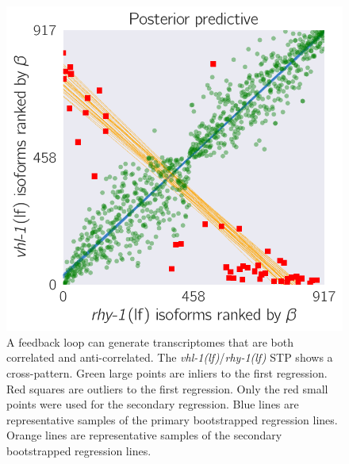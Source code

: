 \documentclass[10pt, onecolumn]{article}
\newcommand{\rhy}{\emph{\mbox{rhy-1}(lf)}}
\newcommand{\vhl}{\emph{\mbox{vhl-1}(lf)}}
\begin{document}
\begin{figure}[tbhp]
\centering
\includegraphics[width=.4\textwidth]{../figs/multiplemodes-ed.pdf}
\caption{
A feedback loop can generate transcriptomes that are both
correlated and anti-correlated. The \vhl{}/\rhy{} STP shows a cross-pattern.
Green large points are inliers to the first
regression. Red squares are outliers to the first regression. Only the red
small points were used for the secondary regression. Blue lines are representative
samples of the primary bootstrapped regression lines. Orange lines are
representative samples of the secondary bootstrapped regression lines.
}
\label{fig:xpattern}
\end{figure}
\end{document}
